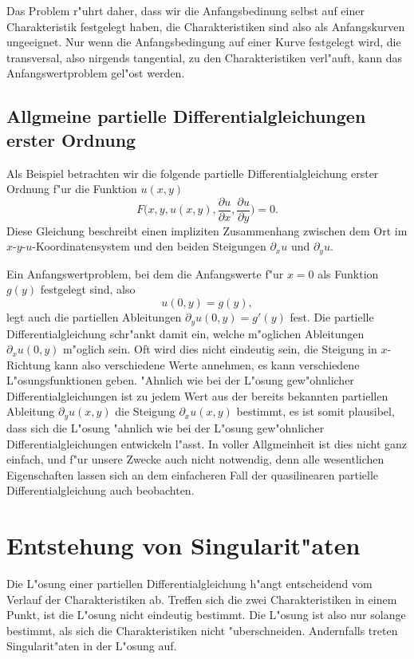Das Problem r"uhrt daher, dass wir die Anfangsbedinung selbst auf einer
Charakteristik festgelegt haben, die Charakteristiken sind also als
Anfangskurven ungeeignet. Nur wenn die Anfangsbedingung auf einer Kurve
festgelegt wird, die transversal, also nirgends tangential, zu den
Charakteristiken verl"auft, kann das Anfangswertproblem gel"ost werden.

\subsection{Allgmeine partielle Differentialgleichungen erster Ordnung}
Als Beispiel betrachten wir die folgende partielle Differentialgleichung
erster Ordnung f"ur die Funktion $u(x,y)$
\begin{equation}
F\biggl(
x,y,u(x,y),\frac{\partial u}{\partial x},\frac{\partial u}{\partial y}
\biggr)=0.
\end{equation}
Diese Gleichung beschreibt einen impliziten Zusammenhang zwischen
dem Ort im $x$-$y$-$u$-Koordinatensystem und den beiden Steigungen
$\partial_xu$ und $\partial_yu$.

Ein Anfangswertproblem, bei dem die Anfangswerte f"ur $x=0$ als
Funktion $g(y)$ festgelegt sind, also
\[
u(0,y)=g(y),
\]
legt auch die
partiellen Ableitungen $\partial_y u(0,y)=g'(y)$ fest.  Die partielle
Differentialgleichung schr"ankt damit ein, welche m"oglichen Ableitungen
$\partial_xu(0,y)$ m"oglich sein. Oft wird dies nicht eindeutig sein,
die Steigung in $x$-Richtung kann also verschiedene Werte annehmen,
es kann verschiedene L"osungsfunktionen geben. "Ahnlich wie bei der
L"osung gew"ohnlicher Differentialgleichungen ist zu jedem Wert
aus der bereits bekannten partiellen Ableitung $\partial_yu(x,y)$
die Steigung $\partial_xu(x,y)$ bestimmt, es ist somit plausibel, dass
sich die L"osung "ahnlich wie bei der L"osung gew"ohnlicher Differentialgleichungen
entwickeln l"asst. In voller Allgmeinheit ist dies nicht ganz einfach,
und f"ur unsere Zwecke auch nicht notwendig, denn alle wesentlichen
Eigenschaften lassen sich an dem einfacheren Fall der quasilinearen
partielle Differentialgleichung auch beobachten.


\section{Entstehung von Singularit"aten}
Die L"osung einer partiellen Differentialgleichung h"angt entscheidend
vom Verlauf der Charakteristiken ab. Treffen sich die zwei Charakteristiken
in einem Punkt, ist die L"osung nicht eindeutig bestimmt. Die L"osung
ist also nur solange bestimmt, als sich die Charakteristiken nicht "uberschneiden.
Andernfalls treten Singularit"aten in der L"osung auf.

